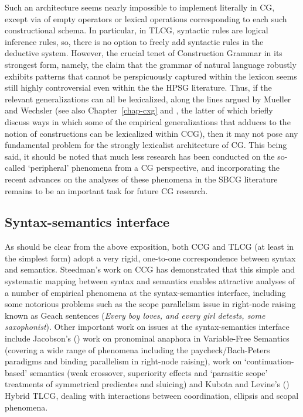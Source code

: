 \documentclass[output=paper]{langsci/langscibook}
\begin{document}
Such an architecture seems nearly impossible to implement literally in
CG, except via of empty operators or lexical operations
corresponding to each such constructional schema. In particular, in
TLCG, syntactic rules are logical inference rules, so, there is no
option to freely add syntactic rules in the deductive system. However,
the crucial tenet of Construction Grammar in its strongest form,
namely, the claim that the grammar of natural language robustly
exhibits patterns that cannot be perspicuously captured within the
lexicon seems still highly controversial even within the the HPSG
literature. Thus, if the relevant generalizations can all be
lexicalized, along the lines argued by Mueller and Wechsler  (see
also Chapter~\ref{chap-cxg} and \citet{steedman2011ccg}, the latter of which
briefly discuss ways in which some of the empirical generalizations
that \citet{Goldberg95a} adduces to the notion of constructions can be
lexicalized within CCG), then it may not pose any fundamental problem
for the strongly lexicalist architecture of CG. 
This being said, it should be noted that much less research has been
conducted on the so-called `peripheral' phenomena from a CG
perspective, and incorporating the recent advances on
the analyses of these phenomena in the SBCG literature
remains to be 
an important task for future CG research. 



\subsection{Syntax-semantics interface }

As should be clear from the above exposition, both CCG and TLCG (at
least in the simplest form) adopt a very rigid, one-to-one
correspondence between syntax and semantics. Steedman's work on CCG
has demonstrated that 
this simple and systematic mapping between syntax and semantics
enables attractive analyses of
a number of empirical phenomena at the syntax-semantics interface,
including some notorious problems such as the scope parallelism issue
in right-node raising known as Geach sentences (\textit{Every boy loves, and
every girl detests, some saxophonist}). Other important work on issues
at the syntax-semantics interface include Jacobson's
(\citeyear{jacobson1999a,jacobson2000a}) work on pronominal anaphora
in Variable-Free Semantics (covering a wide range of phenomena
including the paycheck/Bach-Peters paradigms and binding parallelism
in right-node raising),  work on `continuation-based'
semantics (weak crossover, superiority effects and `parasitic scope'
treatments of symmetrical predicates and sluicing) and Kubota and
Levine's (\citeyear{kubota-levine-coord,kubota-levine-pseudo}) Hybrid TLCG,
dealing with interactions between coordination, ellipsis and scopal
phenomena.
\end{document}
